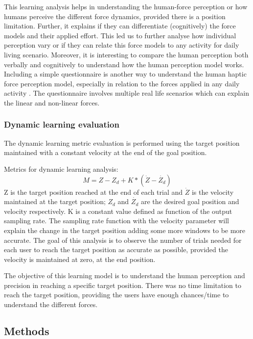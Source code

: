 This learning analysis helps in understanding the human-force perception or how humans perceive the different force dynamics, provided there is a position limitation. Further, it explains if they can differentiate (cognitively) the force models and their applied effort. This led us to further analyse how individual perception vary or if they can relate this force models to any activity for daily living scenario. Moreover, it is interesting to compare the human perception both verbally and cognitively to understand how the human perception model works. Including a simple questionnaire is another way to understand the human haptic force perception model, especially in relation to the forces applied in any daily activity \cite{van2014}. The questionnaire involves multiple real life scenarios which can explain the linear and non-linear forces.


\subsubsection*{Dynamic learning evaluation}
The dynamic learning metric evaluation is performed using the target position maintained with a constant velocity at the end of the goal position.

Metrics for dynamic learning analysis:
%
\begin{equation}
M=Z-Z_d +K* (\dot{Z}-\dot{Z_d})
\end{equation}
%
Z is the target position reached at the end of each trial and $\dot{Z} $ is the velocity maintained at the target position; $Z_d$  and $\dot{Z_d }$  are the desired goal position and velocity respectively. K is a constant value defined as function of the output sampling rate. The sampling rate function with the velocity parameter will explain the change in the target position adding some more windows to be more accurate.  The goal of this analysis is to observe the number of trials needed for each user to reach the target position as accurate as possible, provided the velocity is maintained at zero, at the end position.

The objective of this learning model is to understand the human perception and precision in reaching a specific target position. There was no time limitation to reach the target position, providing the users have enough chances/time to understand the different forces. 

\subsection{Methods}

